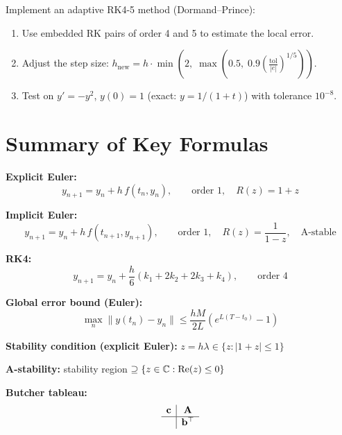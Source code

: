 \begin{exercise}[$\star\star\star$]
\label{ex:ch9-adaptive}
Implement an adaptive RK4-5 method (Dormand--Prince):
\begin{enumerate}
    \item Use embedded RK pairs of order 4 and 5 to estimate the local error.
    \item Adjust the step size: $h_{\text{new}} = h \cdot \min\!\left(2,\; \max\!\left(0.5,\; 0.9\left(\frac{\text{tol}}{|e|}\right)^{1/5}\right)\right)$.
    \item Test on $y' = -y^2$, $y(0) = 1$ (exact: $y = 1/(1+t)$) with tolerance $10^{-8}$.
\end{enumerate}
\end{exercise}

\section*{Summary of Key Formulas}

\begin{keyformulas}
\textbf{Explicit Euler:}
\[
    y_{n+1} = y_n + h\,f(t_n, y_n), \qquad \text{order } 1, \quad R(z) = 1 + z
\]

\textbf{Implicit Euler:}
\[
    y_{n+1} = y_n + h\,f(t_{n+1}, y_{n+1}), \qquad \text{order } 1, \quad R(z) = \frac{1}{1-z}, \quad \text{A-stable}
\]

\textbf{RK4:}
\[
    y_{n+1} = y_n + \frac{h}{6}(k_1 + 2k_2 + 2k_3 + k_4), \qquad \text{order } 4
\]

\textbf{Global error bound (Euler):}
\[
    \max_n \|y(t_n) - y_n\| \leq \frac{hM}{2L}(e^{L(T-t_0)}-1)
\]

\textbf{Stability condition (explicit Euler):} $z = h\lambda \in \{z : |1+z| \leq 1\}$

\textbf{A-stability:} stability region $\supseteq \{z \in \mathbb{C} : \operatorname{Re}(z) \leq 0\}$

\textbf{Butcher tableau:}
\[
\begin{array}{c|c}
    \mathbf{c} & \mathbf{A} \\
    \hline
    & \mathbf{b}^\top
\end{array}
\]
\end{keyformulas}
